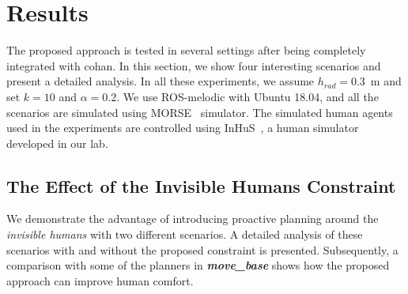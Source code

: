 \section{Results} \label{results_chap5}
The proposed approach is tested in several settings after being completely integrated with \acrshort{cohan}. In this section, we show four interesting scenarios and present a detailed analysis. In all these experiments, we assume $h_{rad}= $\SI{0.3}{\meter} and set $k=10$ and $\alpha=0.2$. We use ROS-melodic with Ubuntu 18.04, and all the scenarios are simulated using MORSE~\cite{echeverria2011modular} simulator. The simulated human agents used in the experiments are controlled using InHuS~\cite{favier2021intelligent}, a human simulator developed in our lab.

\subsection{The Effect of the Invisible Humans Constraint}
We demonstrate the advantage of introducing proactive planning around the \textit{invisible humans} with two different scenarios. A detailed analysis of these scenarios with and without the proposed constraint is presented. Subsequently, a comparison with some of the planners in \textbf{\textit{move\_base}} shows how the proposed approach can improve human comfort.

